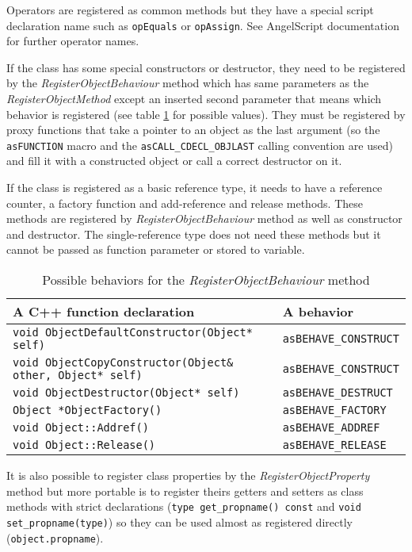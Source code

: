 Operators are registered as common methods but they have a special script declaration name such as \verb/opEquals/ or \verb/opAssign/. See AngelScript documentation \cite{angelscript} for further operator names.

If the class has some special constructors or destructor, they need to be registered by the \emph{RegisterObjectBehaviour} method which has same parameters as the \emph{RegisterObjectMethod} except an inserted second parameter that means which behavior is registered (see table \ref{tab:script-behaviors} for possible values). They must be registered by proxy functions that take a pointer to an object as the last argument (so the \verb/asFUNCTION/ macro and the \verb/asCALL_CDECL_OBJLAST/ calling convention are used) and fill it with a constructed object or call a correct destructor on it.

If the class is registered as a basic reference type, it needs to have a reference counter, a factory function and add-reference and release methods. These methods are registered by \emph{RegisterObjectBehaviour} method as well as constructor and destructor. The single-reference type does not need these methods but it cannot be passed as function parameter or stored to variable.

\begin{table}[htbp]
	\centering
		{\scriptsize
		\begin{tabular}{|p{0.63\hsize}|p{0.30\hsize}|}
		\hline
		A C++ function declaration & A behavior\\
		\hline
		\verb/void ObjectDefaultConstructor(Object* self)/ & \verb/asBEHAVE_CONSTRUCT/\\
		\verb/void ObjectCopyConstructor(Object& other, Object* self)/ & \verb/asBEHAVE_CONSTRUCT/\\
		\verb/void ObjectDestructor(Object* self)/ & \verb/asBEHAVE_DESTRUCT/\\
		\verb/Object *ObjectFactory()/ & \verb/asBEHAVE_FACTORY/\\
		\verb/void Object::Addref()/ & \verb/asBEHAVE_ADDREF/\\
		\verb/void Object::Release()/ & \verb/asBEHAVE_RELEASE/\\
		\hline
		\end{tabular}
		}
	\caption{Possible behaviors for the \emph{RegisterObjectBehaviour} method}
	\label{tab:script-behaviors}
\end{table}

It is also possible to register class properties by the \emph{RegisterObjectProperty} method but more portable is to register theirs getters and setters as class methods with strict declarations (\verb/type get_propname() const/ and \verb/void set_propname(type)/) so they can be used almost as registered directly (\verb/object.propname/).

